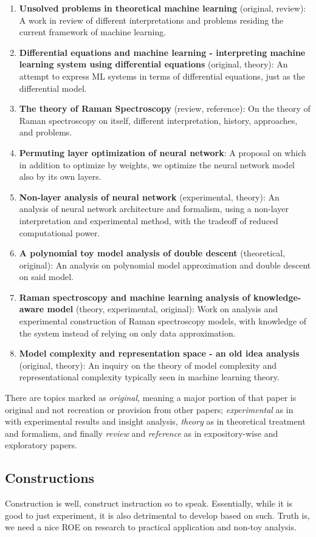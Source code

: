 \begin{enumerate}
    \item \textbf{Unsolved problems in theoretical machine learning} (original, review): A work in review of different interpretations and problems residing the current framework of machine learning. 
    \item \textbf{Differential equations and machine learning - interpreting machine learning system using differential equations} (original, theory): An attempt to express ML systems in terms of differential equations, just as the differential model. 
    \item \textbf{The theory of Raman Spectroscopy} (review, reference): On the theory of Raman spectroscopy on itself, different interpretation, history, approaches, and problems. 
    \item \textbf{Permuting layer optimization of neural network}: A proposal on which in addition to optimize by weights, we optimize the neural network model also by its own layers. 
    \item \textbf{Non-layer analysis of neural network} (experimental, theory): An analysis of neural network architecture and formalism, using a non-layer interpretation and experimental method, with the tradeoff of reduced computational power. 
    \item \textbf{A polynomial toy model analysis of double descent} (theoretical, original): An analysis on polynomial model approximation and double descent on said model. 
    \item \textbf{Raman spectroscopy and machine learning analysis of knowledge-aware model} (theory, experimental, original): Work on analysis and experimental construction of Raman spectroscopy models, with knowledge of the system instead of relying on only data approximation. 
    \item \textbf{Model complexity and representation space - an old idea analysis} (original, theory): An inquiry on the theory of model complexity and representational complexity typically seen in machine learning theory. 
\end{enumerate}

There are topics marked as \textit{original}, meaning a major portion of that paper is original and not recreation or provision from other papers; \textit{experimental} as in with experimental results and insight analysis, \textit{theory} as in theoretical treatment and formalism, and finally \textit{review} and \textit{reference} as in expository-wise and exploratory papers. 

\subsection{Constructions}
Construction is well, construct instruction so to speak. Essentially, while it is good to just experiment, it is also detrimental to develop based on such. Truth is, we need a nice ROE on research to practical application and non-toy analysis. 



